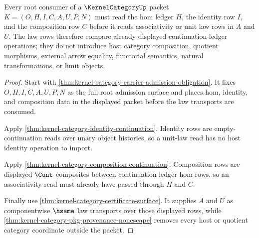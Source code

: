 \begin{theorem}
\label{thm:kernel-category-root-hom-law-triad}
Every root consumer of a $\KernelCategoryUp$ packet $K=(O,H,I,C,A,U,P,N)$ must read the hom ledger $H$, the identity row $I$, and the composition row $C$ before it reads associativity or unit law rows in $A$ and $U$. The law rows therefore compare already displayed continuation-ledger operations; they do not introduce host category composition, quotient morphisms, external arrow equality, functorial semantics, natural transformations, or limit objects.
\end{theorem}
\begin{proof}
Start with \autoref{thm:kernel-category-carrier-admission-obligation}. It fixes $O,H,I,C,A,U,P,N$ as the full root admission surface and places hom, identity, and composition data in the displayed packet before the law transports are consumed.

Apply \autoref{thm:kernel-category-identity-continuation}. Identity rows are empty-continuation reads over unary object histories, so a unit-law read has no host identity operation to import.

Apply \autoref{thm:kernel-category-composition-continuation}. Composition rows are displayed $\Cont$ composites between continuation-ledger hom rows, so an associativity read must already have passed through $H$ and $C$.

Finally use \autoref{thm:kernel-category-certificate-surface}. It supplies $A$ and $U$ as componentwise $\hsame$ law transports over those displayed rows, while \autoref{thm:kernel-category-pkg-provenance-nonescape} removes every host or quotient category coordinate outside the packet.
\end{proof}

